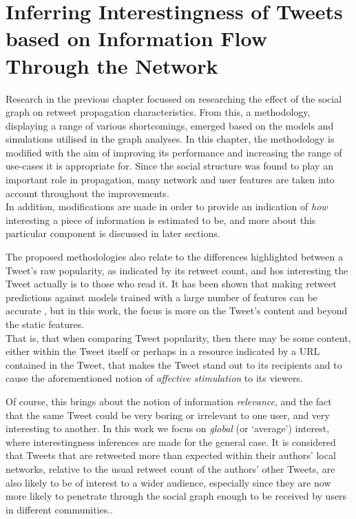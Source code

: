 \chapter{Inferring Interestingness of Tweets based on Information Flow Through the Network}

Research in the previous chapter focussed on researching the effect of the social graph on retweet propagation characteristics. From this, a methodology, displaying a range of various shortcomings, emerged based on the models and simulations utilised in the graph analyses. In this chapter, the methodology is modified with the aim of improving its performance and increasing the range of use-cases it is appropriate for. Since the social structure was found to play an important role in propagation, many network and user features are taken into account throughout the improvements.\\
In addition, modifications are made in order to provide an indication of \textit{how} interesting a piece of information is estimated to be, and more about this particular component is discussed in later sections.

The proposed methodologies also relate to the differences highlighted between a Tweet's raw popularity, as indicated by its retweet count, and hos interesting the Tweet actually is to those who read it. It has been shown that making retweet predictions against models trained with a large number of features can be accurate \cite{zhu11}, but in this work, the focus is more on the Tweet's content and beyond the static features.\\
That is, that when comparing Tweet popularity, then there may be some content, either within the Tweet itself or perhaps in a resource indicated by a URL contained in the Tweet, that makes the Tweet stand out to its recipients and to cause the aforementioned notion of \textit{affective stimulation} \cite{xu07} to its viewers.

Of course, this brings about the notion of information \textit{relevance}, and the fact that the same Tweet could be very boring or irrelevant to one user, and very interesting to another. In this work we focus on \textit{global} (or `average') interest, where interestingness inferences are made for the general case. It is considered that Tweets that are retweeted more than expected within their authors' local networks, relative to the usual retweet count of the authors' other Tweets, are also likely to be of interest to a wider audience, especially since they are now more likely to penetrate through the social graph enough to be received by users in different communities..
 
